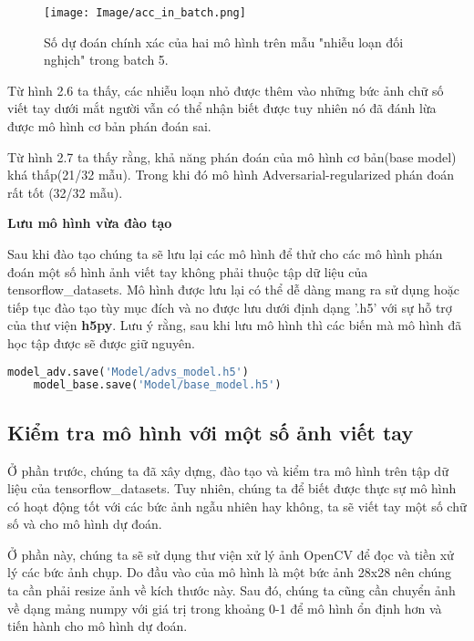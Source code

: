 \begin{figure}[h!]
    \centering
    \texttt{[image: Image/acc\_in\_batch.png]}
    \caption{Số dự đoán chính xác của hai mô hình trên mẫu "nhiễu loạn đối nghịch" trong batch 5.}
    \label{fig 2.7:Số dự đoán chính xác của hai mô hình trên mẫu "nhiễu loạn đối nghich trong batch 5.}
    
\end{figure}

Từ hình 2.6 ta thấy, các nhiễu loạn nhỏ được thêm vào những bức ảnh chữ số viết tay dưới mắt người vẫn có thể nhận biết được
tuy nhiên nó đã đánh lừa được mô hình cơ bản phán đoán sai.

Từ hình 2.7 ta thấy rằng, khả năng phán đoán của mô hình cơ bản(base model) khá thấp(21/32 mẫu). Trong khi đó
mô hình Adversarial-regularized phán đoán rất tốt (32/32 mẫu).


\textbf{Lưu mô hình vừa đào tạo}

Sau khi đào tạo chúng ta sẽ lưu lại các mô hình để thử cho các mô hình phán đoán một số hình ảnh viết tay không phải thuộc tập dữ
liệu của tensorflow\_datasets. Mô hình được lưu lại có thể dễ dàng mang ra sử dụng hoặc tiếp tục đào tạo tùy mục đích và no được lưu dưới định dạng '.h5' với sự hỗ trợ của
thư viện \textbf{h5py}. Lưu ý rằng, sau khi lưu mô hình thì các biến mà mô hình đã học tập được sẽ được giữ nguyên.

\begin{lstlisting}[language = Python]
    model_adv.save('Model/advs_model.h5')
    model_base.save('Model/base_model.h5')
\end{lstlisting}

\cite*{WEBSITE}

\subsection{Kiểm tra mô hình với một số ảnh viết tay}

Ở phần trước, chúng ta đã xây dựng, đào tạo và kiểm tra mô hình trên tập dữ liệu của tensorflow\_datasets. Tuy nhiên, chúng ta 
để biết được thực sự mô hình có hoạt động tốt với các bức ảnh ngẫu nhiên hay không, ta sẽ viết tay một số chữ số và cho mô hình dự đoán.

Ở phần này, chúng ta sẽ sử dụng thư viện xử lý ảnh OpenCV để đọc và tiền xử lý các bức ảnh chụp. Do đầu vào của mô hình là một bức ảnh 28x28
nên chúng ta cần phải resize ảnh về kích thước này. Sau đó, chúng ta cũng cần chuyển ảnh về dạng mảng numpy với giá trị trong khoảng 0-1 để mô hình ổn định hơn và 
tiến hành cho mô hình dự đoán.

